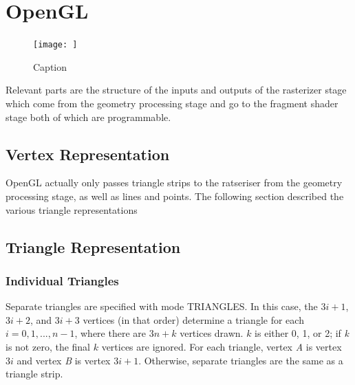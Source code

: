 
\section{OpenGL}
\begin{figure}
    \centering
    \texttt{[image: ]}
    \caption{Caption}
    \label{fig:my_label}
\end{figure}
Relevant parts are the structure of the inputs and outputs of the rasterizer stage which come from the geometry processing stage and go to the fragment shader stage both of which are programmable.
\subsection{Vertex Representation}
OpenGL actually only passes triangle strips to the ratseriser from the geometry processing stage, as well as lines and points. The following section described the various triangle representations
\subsection{Triangle Representation}
\subsubsection{Individual Triangles}
Separate triangles are specified with mode TRIANGLES. In this case, the $3i + 1$, $3i + 2$, and $3i + 3$ vertices (in that order) determine a triangle for each $i = 0, 1, ... , n - 1$, where there are $3n + k$ vertices drawn. $k$ is either 0, 1, or 2; if \textit{k} is not zero, the final $k$ vertices are ignored. For each triangle, vertex \textit{A} is vertex $3i$ and vertex \textit{B} is vertex $3i + 1$. Otherwise, separate triangles are the same as a triangle strip.
